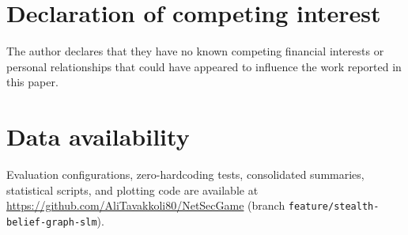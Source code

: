 \documentclass[a4paper,fleqn]{cas-dc}
\begin{document}
\section*{Declaration of competing interest}
The author declares that they have no known competing financial interests or personal relationships that could have appeared to influence the work reported in this paper.

\section*{Data availability}
{\sloppy Evaluation configurations, zero-hardcoding tests, consolidated summaries, statistical scripts, and plotting code are available at \url{https://github.com/AliTavakkoli80/NetSecGame} (branch \texttt{feature/stealth-belief-graph-slm}).\par}



\end{document}
